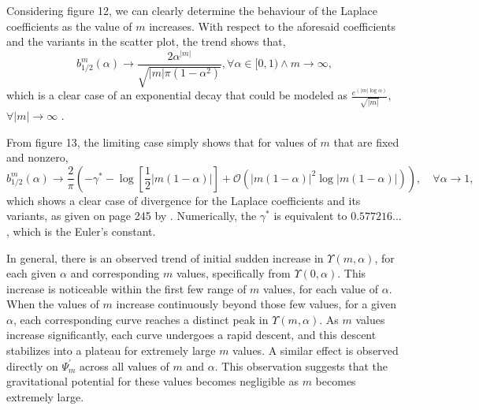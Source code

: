\documentclass{article}
\begin{document}

Considering figure 12, we can clearly determine the behaviour of the Laplace coefficients as the value of $m$ increases. With respect to the aforesaid coefficients and the variants in the scatter plot, the trend shows that,
\begin{equation}
    b_{1/2}^{m}(\alpha) \rightarrow \frac{2\alpha^{|m|}}{\sqrt{|m|\pi(1 - \alpha^{2})}}, \forall \alpha \in [0,1) \land m \rightarrow \infty,
\end{equation}
which is a clear case of an exponential decay that could be modeled as $\frac{e^{(|m|\log\alpha)}}{\sqrt{|m|}}$, $\forall |m| \rightarrow \infty$ \cite{tremaine2023dynamics}.

From figure 13, the limiting case simply shows that for values of $m$ that are fixed and nonzero, 
\begin{equation}
b_{1/2}^{m}(\alpha) \rightarrow \frac{2}{\pi}\left( - \gamma^{*} - \log\left[\frac{1}{2}|m(1-\alpha)|\right] + \mathcal{O}\left(|m(1-\alpha)|^{2}\log|m(1-\alpha)|\right) \right), \quad \forall \alpha \rightarrow 1,
\end{equation}
which shows a clear case of divergence for the Laplace coefficients and its variants, as given on page 245 by \cite{tremaine2023dynamics}. Numerically, the $\gamma^{*}$ is equivalent to $0.577216...$, which is the Euler's constant.

In general, there is an observed trend of initial sudden increase in $\Upsilon(m,\alpha)$, for each given $\alpha$ and corresponding $m$ values, specifically from $\Upsilon(0,\alpha)$. This increase is noticeable within the first few range of $m$ values, for each value of $\alpha$. When the values of $m$ increase continuously beyond those few values, for a given $\alpha$, each corresponding curve reaches a distinct peak in $\Upsilon(m,\alpha)$. As $m$ values increase significantly, each curve undergoes a rapid descent, and this descent stabilizes into a plateau for extremely large $m$ values. A similar effect is observed directly on $\Psi_{m}^{'}$ across all values of $m$ and $\alpha$. This observation suggests that the gravitational potential for these values becomes negligible as $m$ becomes extremely large.
\end{document}
